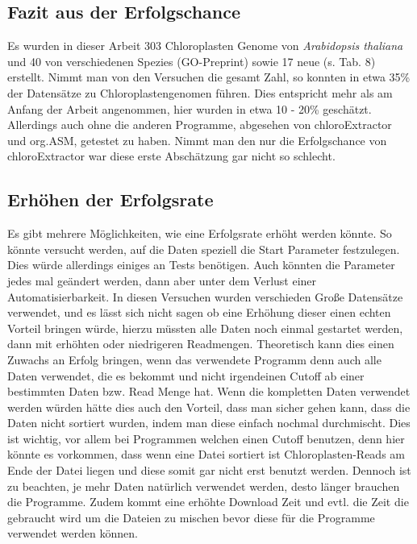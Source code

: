 \documentclass{scrartcl}
\begin{document}
\subsection{Fazit aus der Erfolgschance}
\label{sec-5-3}
Es wurden in dieser Arbeit 303 Chloroplasten Genome von \emph{Arabidopsis thaliana} und 40 von verschiedenen Spezies (GO-Preprint) sowie 17 neue (s. Tab. 8) erstellt. Nimmt man von den Versuchen die gesamt Zahl, so konnten in etwa 35\% der Datensätze zu Chloroplastengenomen führen.
Dies entspricht mehr als am Anfang der Arbeit angenommen, hier wurden in etwa 10 - 20\% geschätzt\footnotemark[47]{}. Allerdings auch ohne die anderen Programme, abgesehen von chloroExtractor und org.ASM, getestet zu haben. Nimmt man 
den nur die Erfolgschance von chloroExtractor war diese erste Abschätzung gar nicht so schlecht.   
\subsection{Erhöhen der Erfolgsrate}
\label{sec-5-4}
Es gibt mehrere Möglichkeiten, wie eine Erfolgsrate erhöht werden könnte. So könnte versucht werden, auf die Daten speziell die Start Parameter festzulegen. Dies würde allerdings einiges an Tests benötigen. 
Auch könnten die Parameter jedes mal 
geändert werden, dann aber unter dem Verlust einer Automatisierbarkeit. In diesen Versuchen wurden verschieden Große Datensätze verwendet, und es lässt sich nicht sagen ob eine Erhöhung dieser einen echten Vorteil bringen würde, 
hierzu müssten alle Daten noch einmal gestartet werden, dann mit erhöhten oder niedrigeren Readmengen. Theoretisch kann dies einen Zuwachs an Erfolg bringen, wenn das verwendete Programm denn auch alle Daten verwendet, 
die es bekommt und nicht
irgendeinen Cutoff ab einer bestimmten Daten bzw. Read Menge hat. Wenn die kompletten Daten verwendet werden würden hätte dies auch den Vorteil, dass man sicher gehen kann, dass die Daten nicht sortiert wurden, indem man diese
einfach nochmal durchmischt. Dies ist wichtig, vor allem bei Programmen welchen einen Cutoff benutzen, denn hier könnte es vorkommen, dass wenn eine Datei sortiert ist Chloroplasten-Reads am Ende der Datei liegen und diese somit
gar nicht erst benutzt werden. Dennoch ist zu beachten, je mehr Daten natürlich verwendet werden, desto länger brauchen die Programme. Zudem kommt eine erhöhte Download Zeit und evtl. die Zeit die gebraucht wird um die Dateien zu 
mischen bevor diese für die Programme verwendet werden können. 
\end{document}
